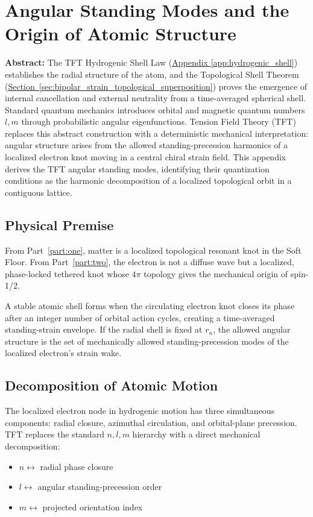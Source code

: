 \chapter{Angular Standing Modes and the Origin of Atomic Structure}
\label{app:atomic_angular_modes}

\noindent\textbf{Abstract:} The TFT Hydrogenic Shell Law (\hyperref[app:hydrogenic_shell]{Appendix \ref*{app:hydrogenic_shell}}) establishes the radial structure of the atom, and the Topological Shell Theorem (\hyperref[sec:bipolar_strain_topological_superposition]{Section~\ref*{sec:bipolar_strain_topological_superposition}}) proves the emergence of internal cancellation and external neutrality from a time-averaged spherical shell. Standard quantum mechanics introduces orbital and magnetic quantum numbers $l,m$ through probabilistic angular eigenfunctions. Tension Field Theory (TFT) replaces this abstract construction with a deterministic mechanical interpretation: angular structure arises from the allowed standing-precession harmonics of a localized electron knot moving in a central chiral strain field. This appendix derives the TFT angular standing modes, identifying their quantization conditions as the harmonic decomposition of a localized topological orbit in a contiguous lattice.

\section{Physical Premise}
From Part~\ref{part:one}, matter is a localized topological resonant knot in the Soft Floor. From Part~\ref{part:two}, the electron is not a diffuse wave but a localized, phase-locked tethered knot whose $4\pi$ topology gives the mechanical origin of spin-1/2.

A stable atomic shell forms when the circulating electron knot closes its phase after an integer number of orbital action cycles, creating a time-averaged standing-strain envelope. If the radial shell is fixed at $r_n$, the allowed angular structure is the set of mechanically allowed standing-precession modes of the localized electron's strain wake.

\section{Decomposition of Atomic Motion}
The localized electron node in hydrogenic motion has three simultaneous components: radial closure, azimuthal circulation, and orbital-plane precession. TFT replaces the standard $n, l, m$ hierarchy with a direct mechanical decomposition:
\begin{itemize}
    \item $n \leftrightarrow$ radial phase closure
    \item $l \leftrightarrow$ angular standing-precession order
    \item $m \leftrightarrow$ projected orientation index
\end{itemize}

